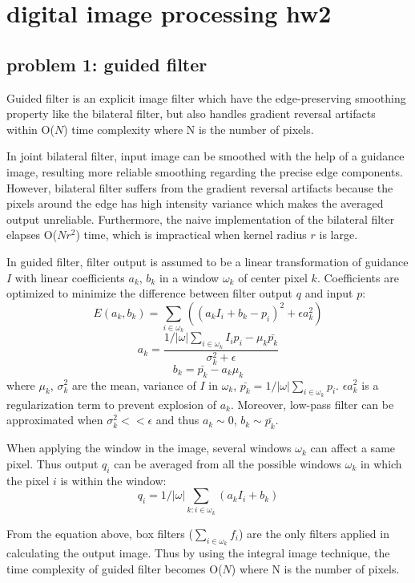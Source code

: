 \documentclass[extendedabs]{bmvc2k}
\begin{document}
\section*{digital image processing hw2}
\subsection*{problem 1: guided filter}

Guided filter \cite{guided} is an explicit image filter which have the edge-preserving 
smoothing property like the bilateral filter, but also handles gradient reversal artifacts
within O($N$) time complexity where N is the number of pixels.

In joint bilateral filter, input image can be smoothed with the help of a guidance image,
resulting more reliable smoothing regarding the precise edge components. However,
bilateral filter suffers from the gradient reversal artifacts because the pixels around
the edge has high intensity variance which makes the averaged output unreliable. 
Furthermore, the naive implementation of the bilateral filter elapses O($Nr^2$) time, 
which is impractical when kernel radius $r$ is large.

In guided filter, filter output is assumed to be a linear transformation of guidance $I$
with linear coefficients $a_k$, $b_k$ in a window $\omega_k$ of center pixel $k$.
Coefficients are optimized to minimize the difference between filter output $q$ and input $p$:
\[E(a_k,b_k) = \sum_{i \in \omega_k}((a_kI_i + b_k - p_i)^2 + \epsilon a_k^2)\]
\[a_k=\frac{1/|\omega|\sum_{i \in \omega_k}I_ip_i - \mu_k\bar{p_k}}{\sigma_k^2+\epsilon}\]
\[b_k=\bar{p_k} - a_k\mu_k\]
where $\mu_k$, $\sigma_k^2$ are the mean, variance of $I$ in $\omega_k$, 
$\bar{p_k}=1/|\omega|\sum_{i \in \omega_k}p_i$.
$\epsilon a_k^2$ is a regularization term to prevent explosion of $a_k$.
Moreover, low-pass filter can be approximated when $\sigma_k^2 << \epsilon$ and thus
$a_k \sim 0$, $b_k \sim \bar{p_k}$.

When applying the window in the image, several windows $\omega_k$ can affect a same pixel.
Thus output $q_i$ can be averaged from all the possible windows $\omega_k$ in which the pixel $i$
is within the window:
\[q_i = 1/|\omega|\sum_{k:i \in \omega_k}(a_kI_i + b_k)\]

From the equation above, box filters ($\sum_{i \in \omega_k}f_i$) are the only filters
applied in calculating the output image. Thus by using the integral image technique, 
the time complexity of guided filter becomes O($N$) where N is the number of pixels.
\end{document}
